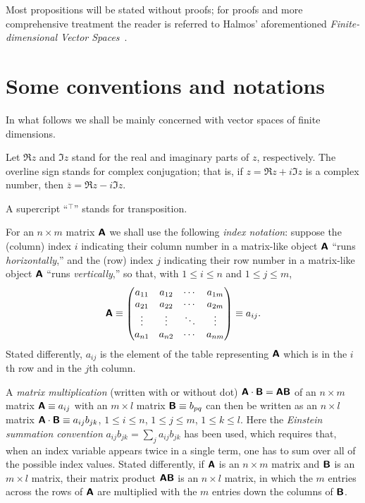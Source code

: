 Most propositions will be stated without proofs; for proofs and more comprehensive treatment the reader is referred to
Halmos' aforementioned {\em Finite-dimensional Vector Spaces}~\cite{halmos-vs}.

\section{Some conventions and notations}

In what follows we shall be mainly concerned with vector spaces of finite dimensions.


Let $\Re z$ and $\Im z$ stand for the real and imaginary parts of $z$, respectively.
The overline sign stands for complex conjugation; that is,
if
$z= \Re z + i \Im z $ is a complex number, then
$\overline{z}= \Re z - i \Im z$.

A supercript ``$^\intercal$'' stands for transposition.



For an $n \times m$ matrix $\textsf{\textbf{A}}$ we shall use the following {\em index notation}:
suppose the (column) index $i$  indicating their column number in a matrix-like object $\textsf{\textbf{A}}$ ``runs {\em horizontally},''
and
the (row) index $j$  indicating their row number in a matrix-like object  $\textsf{\textbf{A}}$ ``runs {\em vertically},''
so that, with
$1 \le i \le n$ and
$1 \le j \le m$,
\begin{equation}
\textsf{\textbf{A}}
\equiv
\begin{pmatrix}
a_{11}&a_{12}& \cdots & a_{1m}\\
a_{21}&a_{22}& \cdots & a_{2m}\\
\vdots &\vdots & \ddots & \vdots \\
a_{n1}&a_{n2}& \cdots & a_{nm}
\end{pmatrix}
\equiv a_{ij}
.
\label{2016-m-ch-fdvs-matrixind}
\end{equation}
Stated differently, $a_{ij}$ is the element  of the table representing $\textsf{\textbf{A}}$ which is in the $i$th row and in the $j$th column.

A {\em matrix multiplication}
 (written with or without dot)
$\textsf{\textbf{A}} \cdot \textsf{\textbf{B}} = \textsf{\textbf{A}}  \textsf{\textbf{B}}$
of an $n \times m$ matrix $\textsf{\textbf{A}}\equiv a_{ij}$
with an $m \times l$ matrix $\textsf{\textbf{B}}\equiv b_{pq}$
can then be written as an $n \times l$ matrix
$\textsf{\textbf{A}} \cdot \textsf{\textbf{B}} \equiv a_{ij}b_{jk}$,
$1\le i\le n$,
$1\le j\le m$,
$1\le k\le l$.
Here the {\em Einstein summation convention}
$a_{ij}b_{jk} = \sum_j a_{ij}b_{jk}$
has been used,
which requires that, when an index variable appears twice in a single term, one has to
sum over all of the possible index values.
Stated differently, if $\textsf{\textbf{A}}$ is an $n \times m$ matrix and $\textsf{\textbf{B}}$ is an $m \times l$ matrix,
their matrix product $\textsf{\textbf{A}}\textsf{\textbf{B}}$ is an $n \times l$ matrix, in which the $m$
entries across the rows of $\textsf{\textbf{A}}$ are multiplied with the $m$ entries down the columns of $\textsf{\textbf{B}}$.


